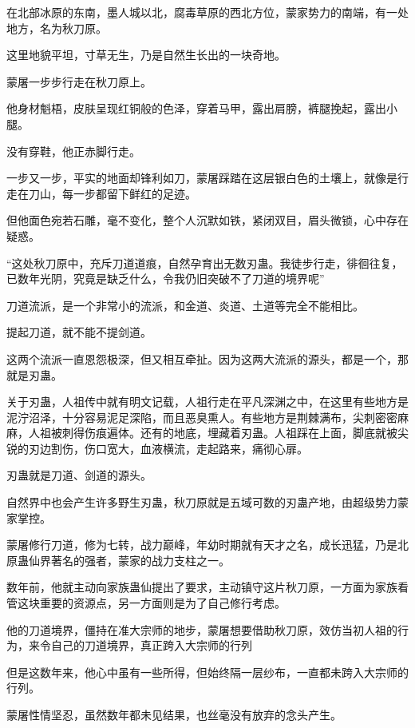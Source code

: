 
\begin{this_body}



在北部冰原的东南，墨人城以北，腐毒草原的西北方位，蒙家势力的南端，有一处地方，名为秋刀原。

这里地貌平坦，寸草无生，乃是自然生长出的一块奇地。

蒙屠一步步行走在秋刀原上。

他身材魁梧，皮肤呈现红铜般的色泽，穿着马甲，露出肩膀，裤腿挽起，露出小腿。

没有穿鞋，他正赤脚行走。

一步又一步，平实的地面却锋利如刀，蒙屠踩踏在这层银白色的土壤上，就像是行走在刀山，每一步都留下鲜红的足迹。

但他面色宛若石雕，毫不变化，整个人沉默如铁，紧闭双目，眉头微锁，心中存在疑惑。

“这处秋刀原中，充斥刀道道痕，自然孕育出无数刃蛊。我徒步行走，徘徊往复，已数年光阴，究竟是缺乏什么，令我仍旧突破不了刀道的境界呢”

刀道流派，是一个非常小的流派，和金道、炎道、土道等完全不能相比。

提起刀道，就不能不提剑道。

这两个流派一直恩怨极深，但又相互牵扯。因为这两大流派的源头，都是一个，那就是刃蛊。

关于刃蛊，人祖传中就有明文记载，人祖行走在平凡深渊之中，在这里有些地方是泥泞沼泽，十分容易泥足深陷，而且恶臭熏人。有些地方是荆棘满布，尖刺密密麻麻，人祖被刺得伤痕遍体。还有的地底，埋藏着刃蛊。人祖踩在上面，脚底就被尖锐的刃边割伤，伤口宽大，血液横流，走起路来，痛彻心扉。

刃蛊就是刀道、剑道的源头。

自然界中也会产生许多野生刃蛊，秋刀原就是五域可数的刃蛊产地，由超级势力蒙家掌控。

蒙屠修行刀道，修为七转，战力巅峰，年幼时期就有天才之名，成长迅猛，乃是北原蛊仙界著名的强者，蒙家的战力支柱之一。

数年前，他就主动向家族蛊仙提出了要求，主动镇守这片秋刀原，一方面为家族看管这块重要的资源点，另一方面则是为了自己修行考虑。

他的刀道境界，僵持在准大宗师的地步，蒙屠想要借助秋刀原，效仿当初人祖的行为，来令自己的刀道境界，真正跨入大宗师的行列

但是这数年来，他心中虽有一些所得，但始终隔一层纱布，一直都未跨入大宗师的行列。

蒙屠性情坚忍，虽然数年都未见结果，也丝毫没有放弃的念头产生。


\end{this_body}
